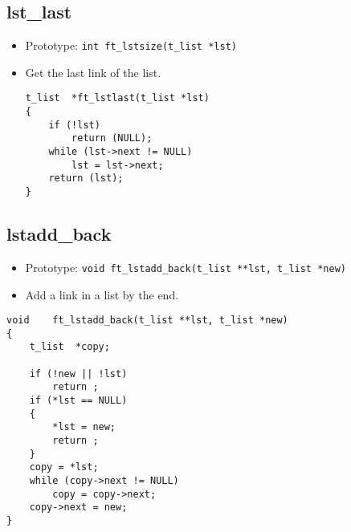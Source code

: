 \documentclass{article}
\begin{document}
		\subsection{lst\_last}
			\begin{itemize}[label=$\rightarrow$]
				\item Prototype: \texttt{int ft\_lstsize(t\_list *lst) }
				\item Get the last link of the list.
				\begin{verbatim}
t_list  *ft_lstlast(t_list *lst)                                                
{                                                                               
    if (!lst)                                                                   
        return (NULL);                                                          
    while (lst->next != NULL)                                                   
        lst = lst->next;                                                        
    return (lst);                                                               
} 
				\end{verbatim}
			\end{itemize}
		
		\subsection{lstadd\_back}
			\begin{itemize}[label=$\rightarrow$]
				\item Prototype: \texttt{void    ft\_lstadd\_back(t\_list **lst, t\_list *new)}
				\item Add a link in a list by the end.
			\end{itemize}
			\begin{verbatim}
void    ft_lstadd_back(t_list **lst, t_list *new)                               
{                                                                               
    t_list  *copy;                                                              
                                                                                
    if (!new || !lst)                                                           
        return ;                                                                
    if (*lst == NULL)                                                           
    {                                                                           
        *lst = new;                                                             
        return ;                                                                
    }                                                                           
    copy = *lst;                                                                
    while (copy->next != NULL)                                                  
        copy = copy->next;                                                      
    copy->next = new;                                                           
}
			\end{verbatim}
		
\end{document}
